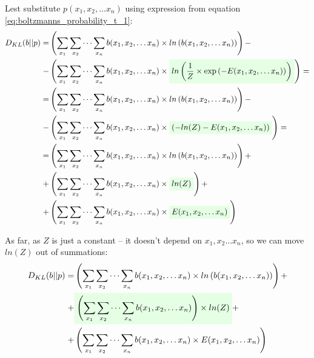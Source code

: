 \documentclass[fleqn,leqno]{article}
\newcommand{\highlight}[1]{\colorbox{green!10}{$\displaystyle#1$}}
\begin{document}
Lest substitute $p(x_1, x_2, \dots x_n)$ using expression from equation \eqref{eq:boltzmanns_probability_t_1}:
\begin{equation}
\begin{split}
D_{KL}(b||p) = & \left( \sum_{x_1} \sum_{x_2} \cdots \sum_{x_n} b(x_1, x_2, \dots x_n) \times ln \left( b(x_1, x_2, \dots x_n) \right) \right) - \\
             - & \left( \sum_{x_1} \sum_{x_2} \cdots \sum_{x_n} b(x_1, x_2, \dots x_n) \times \highlight{ ln \left( {1 \over Z} \times \exp \left(-E(x_1, x_2, \dots x_n) \right) \right) } \right) = \\
            = & \left( \sum_{x_1} \sum_{x_2} \cdots \sum_{x_n} b(x_1, x_2, \dots x_n) \times ln \left( b(x_1, x_2, \dots x_n) \right) \right) - \\
             - & \left( \sum_{x_1} \sum_{x_2} \cdots \sum_{x_n} b(x_1, x_2, \dots x_n) \times \highlight{ \left( -ln(Z) -E(x_1, x_2, \dots x_n) \right) } \right) = \\
            = & \left( \sum_{x_1} \sum_{x_2} \cdots \sum_{x_n} b(x_1, x_2, \dots x_n) \times ln \left( b(x_1, x_2, \dots x_n) \right) \right) + \\
            + & \left( \sum_{x_1} \sum_{x_2} \cdots \sum_{x_n} b(x_1, x_2, \dots x_n) \times \highlight{ ln(Z) } \right) + \\
             + & \left( \sum_{x_1} \sum_{x_2} \cdots \sum_{x_n} b(x_1, x_2, \dots x_n) \times \highlight{ E(x_1, x_2, \dots x_n) } \right) \\
\end{split}
\end{equation}

As far, as $Z$ is just a constant -- it doesn't depend on $x_1, x_2 \dots x_n$, so we can move $ln(Z)$ out of summations:
\begin{equation}
\begin{split}
D_{KL}(b||p) = & \left( \sum_{x_1} \sum_{x_2} \cdots \sum_{x_n} b(x_1, x_2, \dots x_n) \times ln \left( b(x_1, x_2, \dots x_n) \right) \right) + \\
            + & \highlight{ \left( \sum_{x_1} \sum_{x_2} \cdots \sum_{x_n} b(x_1, x_2, \dots x_n) \right) \times ln(Z) } + \\
            + & \left( \sum_{x_1} \sum_{x_2} \cdots \sum_{x_n} b(x_1, x_2, \dots x_n) \times E(x_1, x_2, \dots x_n) \right) \\
\end{split}
\end{equation}
\end{document}
